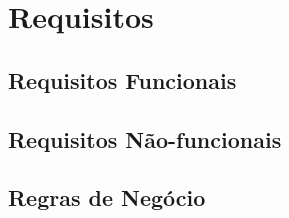 \chapter{Requisitos}

\section{Requisitos Funcionais}

\section{Requisitos Não-funcionais}

\section{Regras de Negócio}